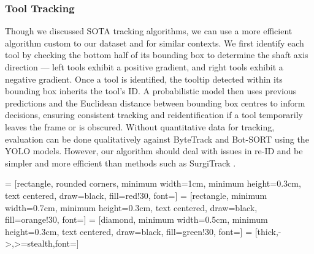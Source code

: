 \subsubsection{Tool Tracking}

Though we discussed SOTA tracking algorithms, we can use a more efficient algorithm custom to our dataset and for similar contexts. We first identify each tool by checking the bottom half of its bounding box to determine the shaft axis direction — left tools exhibit a positive gradient, and right tools exhibit a negative gradient. Once a tool is identified, the tooltip detected within its bounding box inherits the tool's ID. A probabilistic model then uses previous predictions and the Euclidean distance between bounding box centres to inform decisions, ensuring consistent tracking and reidentification if a tool temporarily leaves the frame or is obscured. Without quantitative data for tracking, evaluation can be done qualitatively against ByteTrack \cite{ByteTrack} and Bot-SORT \cite{BoT-SORT} using the YOLO models. However, our algorithm should deal with issues in re-ID and be simpler and more efficient than methods such as SurgiTrack \cite{SurgiTrack}.

 = [rectangle, rounded corners, minimum width=1cm, minimum height=0.3cm, text centered, draw=black, fill=red!30, font=\tiny]
 = [rectangle, minimum width=0.7cm, minimum height=0.3cm, text centered, draw=black, fill=orange!30, font=\tiny]
 = [diamond, minimum width=0.5cm, minimum height=0.3cm, text centered, draw=black, fill=green!30, font=\tiny]
 = [thick,->,>=stealth,font=\tiny]



